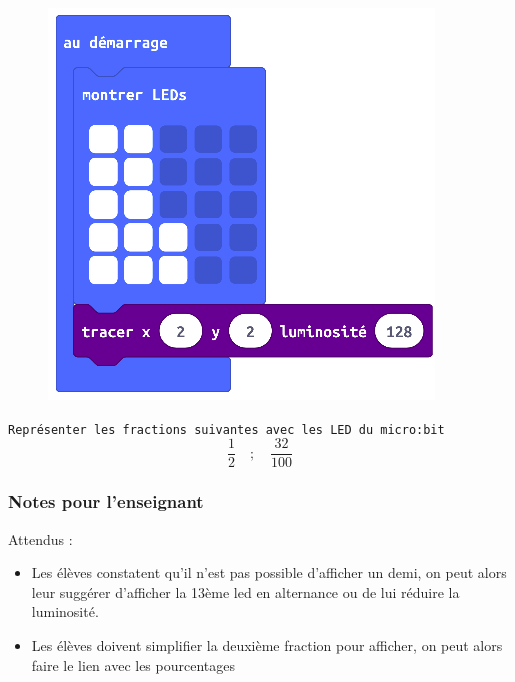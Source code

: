 
%
%
\begin{figure}
    \includegraphics[width=\linewidth]{res/mb-fraction2.png}
\end{figure}

\begin{eleve}    
    \texttt{Représenter les fractions suivantes avec les LED du micro:bit}
    $$
    \frac{1}{2} \quad ; \quad \frac{32}{100}
    $$
\end{eleve}

%
%
\subsubsection{Notes pour l'enseignant}

Attendus :

\begin{itemize}
    \item Les élèves constatent qu’il n’est pas possible d’afficher un demi, on peut alors leur suggérer d’afficher la 13ème led en alternance ou de lui réduire la luminosité.
    \item Les élèves doivent simplifier la deuxième fraction pour afficher, on peut alors faire le lien avec les pourcentages
\end{itemize}


